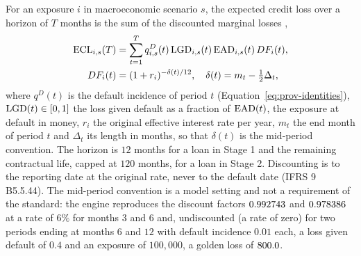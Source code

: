 For an exposure $i$ in macroeconomic scenario $s$, the expected credit loss over a horizon of $T$ months is the sum of the discounted marginal losses \citep{provisions:gppc2016,provisions:ifrs9},
\begin{equation}
\begin{split}
\mathrm{ECL}_{i,s}(T)&=\sum_{t=1}^{T} q^{D}_{i,s}(t)\,\mathrm{LGD}_{i,s}(t)\,\mathrm{EAD}_{i,s}(t)\,DF_i(t),\\
DF_i(t)&=(1+r_i)^{-\delta(t)/12},\quad \delta(t)=m_t-\tfrac12\Delta_t,
\end{split}
\label{eq:prov-ecl}
\end{equation}
where $q^{D}(t)$ is the default incidence of period $t$ (Equation~\ref{eq:prov-identities}), $\mathrm{LGD}(t)\in[0,1]$ the loss given default as a fraction of $\mathrm{EAD}(t)$, the exposure at default in money, $r_i$ the original effective interest rate per year,
$m_t$ the end month of period $t$ and $\Delta_t$ its length in months, so that $\delta(t)$ is the mid-period convention. The horizon is $12$ months for a loan in Stage 1 and the remaining
contractual life, capped at $120$ months, for a loan in Stage 2. Discounting is to the reporting date at the original rate, never to the default date (IFRS 9 B5.5.44). The mid-period convention is a model setting and not a requirement of the standard: the engine
reproduces the discount factors $0.992743$ and $0.978386$ at a rate of $6\%$ for months $3$ and $6$ and, undiscounted (a rate of zero) for two periods ending at months $6$ and $12$ with default incidence $0.01$ each, a loss given default of $0.4$ and an exposure of $100{,}000$, a golden loss of $800.0$.

